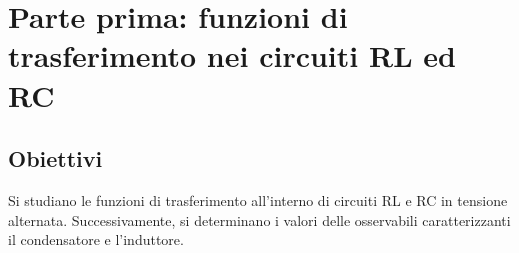 \documentclass[a4paper]{article}
\begin{document}
\section{Parte prima: funzioni di trasferimento nei circuiti RL ed RC}
\subsection{Obiettivi}
Si studiano le funzioni di trasferimento all'interno di circuiti RL e RC in tensione alternata. Successivamente, si determinano i valori delle osservabili caratterizzanti il condensatore e l'induttore.
\end{document}
